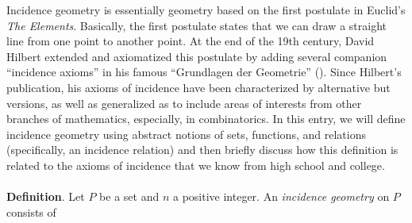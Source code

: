 \documentclass[12pt]{article}
\begin{document}
Incidence geometry is essentially geometry based on the first postulate in Euclid's \emph{The Elements}.  Basically, the first postulate states that we can draw a straight line from one point to another point.  At the end of the 19th century, David Hilbert extended and axiomatized this postulate by adding several companion ``incidence axioms'' in his famous ``Grundlagen der Geometrie'' ().  Since Hilbert's publication, his axioms of incidence have been characterized by alternative but  versions, as well as generalized as to include areas of interests from other branches of mathematics, especially, in combinatorics.  In this entry, we will define incidence geometry using abstract notions of sets, functions, and relations (specifically, an incidence relation) and then briefly discuss how this definition is related to the axioms of incidence that we know from high school and college.
\\\\
\textbf{Definition}.  Let $P$ be a set and $n$ a positive integer. An \emph{incidence geometry} on $P$ consists of
\end{document}
